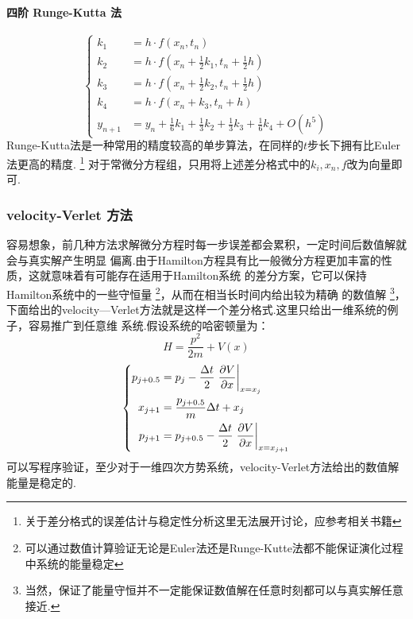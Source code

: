     \paragraph{四阶 Runge-Kutta 法}
    \begin{equation}
        \left\{
            \begin{split}
                k_1 &= h\cdot f(x_n, t_n)\\
                k_2 &= h\cdot f(x_n + \frac{1}{2}k_1, t_n + \frac{1}{2}h)\\
                k_3 &= h\cdot f(x_n + \frac{1}{2}k_2, t_n + \frac{1}{2}h)\\
                k_4 &= h\cdot f(x_n + k_3, t_n + h)\\
                y_{n + 1} &= y_n + \frac{1}{6}k_1 + \frac{1}{3}k_2 + \frac{1}{3}k_3 + \frac{1}{6}k_4 + O(h^5)
            \end{split}
        \right.
    \end{equation}
    Runge-Kutta法是一种常用的精度较高的单步算法，在同样的$t$步长下拥有比Euler法更高的精度.
    \footnote{
        关于差分格式的误差估计与稳定性分析这里无法展开讨论，应参考相关书籍
    }
    对于常微分方程组，只用将上述差分格式中的$k_i, x_n, f$改为向量即可.
    \subsubsection{velocity-Verlet 方法}
    容易想象，前几种方法求解微分方程时每一步误差都会累积，一定时间后数值解就会与真实解产生明显
    偏离.由于Hamilton方程具有比一般微分方程更加丰富的性质，这就意味着有可能存在适用于Hamilton系统
    的差分方案，它可以保持Hamilton系统中的一些守恒量
    \footnote{
        可以通过数值计算验证无论是Euler法还是Runge-Kutte法都不能保证演化过程中系统的能量稳定
    }，从而在相当长时间内给出较为精确
    的数值解
    \footnote{
        当然，保证了能量守恒并不一定能保证数值解在任意时刻都可以与真实解任意接近.
    }，下面给出的velocity—Verlet方法就是这样一个差分格式.这里只给出一维系统的例子，容易推广到任意维
    系统.假设系统的哈密顿量为：
    \begin{equation}
        H = \frac{p^2}{2m} + V(x)
    \end{equation}
    \begin{equation}
        \left\{
            \begin{split}
                p_{j+0.5} &= p_j - \frac{\Delta t}{2}\left.\frac{\partial{V}}{\partial{x}}\right|_{x = x_j}\\
                x_{j+1} &= \frac{p_{j+0.5}}{m}\Delta t + x_{j}\\
                p_{j+1} &= p_{j+0.5} - \frac{\Delta t}{2}\left.\frac{\partial{V}}{\partial{x}}\right|_{x=x_{j+1}}
            \end{split}
        \right.
    \end{equation}
    可以写程序验证，至少对于一维四次方势系统，velocity-Verlet方法给出的数值解能量是稳定的.

